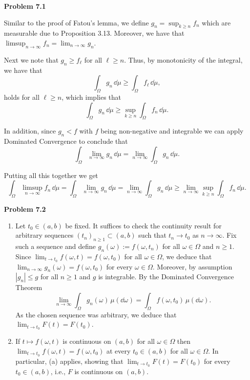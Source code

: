 \documentclass{lecturenotes}
\begin{document}
\textbf{Problem 7.1}

Similar to the proof of Fatou's lemma, we define $g_n = \sup_{k \ge n} f_n$ which are measurable due to Proposition 3.13. Moreover, we have that $\limsup_{n \to \infty} f_n = \lim_{n \to \infty} g_n$.

Next we note that $g_n \ge f_\ell$ for all $\ell \ge n$. Thus, by monotonicity of the integral, we have that
\[
	\int_\Omega g_n \, \dd \mu \ge \int_\Omega f_\ell \, \dd \mu,
\]
holds for all $\ell \ge n$, which implies that
\[
	\int_\Omega g_n \, \dd \mu \ge \sup_{k \ge n} \int_\Omega f_n \, \dd \mu.
\]

In addition, since $g_n < f$ with $f$ being non-negative and integrable we can apply Dominated Convergence to conclude that
\[
	\int_\Omega \lim_{n \to \infty} g_n \, \dd \mu = \lim_{n \to \infty} \int_\Omega g_n \, \dd \mu.
\]

Putting all this together we get
\[
	\int_\Omega \limsup_{n \to \infty} f_n \, \dd \mu
	= \int_\Omega \lim_{n \to \infty} g_n \, \dd \mu = \lim_{n \to \infty} \int_\Omega g_n \, \dd \mu \ge \lim_{n \to \infty} \sup_{k \ge n} \int_\Omega f_n \, \dd \mu.
\]

\bigskip

\textbf{Problem 7.2}

\begin{enumerate}[label={(\alph*)}]
	\item Let $t_0\in (a,b)$ be fixed. It suffices to check the continuity result for arbitrary sequences $(t_n)_{n\ge 1} \subset (a, b)$ such that $t_n\to t_0$ as $n\to\infty$. Fix such a sequence and define $g_n(\omega):= f(\omega,t_n)$ for all $\omega\in\Omega$ and $n\ge 1$. Since $\lim_{t\to t_0}f(\omega,t)=f(\omega,t_0)$ for all $\omega\in\Omega$, we deduce that $\lim_{n\to\infty} g_n(\omega) = f(\omega,t_0)$ for every $\omega\in\Omega$. Moreover, by assumption $|g_n| \le g$ for all $n \ge 1$ and $g$ is integrable. By the Dominated Convergence Theorem
\[
	\lim_{n\to\infty} \int_\Omega g_n(\omega)\,\mu(\dd\omega) = \int_\Omega f(\omega,t_0)\,\mu(\dd\omega).
\]
As the chosen sequence was arbitrary, we deduce that $\lim_{t\to t_0} F(t) = F(t_0)$.

	\item If $t\mapsto f(\omega,t)$ is continuous on $(a, b)$ for all $\omega\in\Omega$ then $\lim_{t\to t_0}f(\omega,t)=f(\omega,t_0)$ at every $t_0\in(a,b)$ for all $\omega\in\Omega$. In particular, (a) applies, showing that $\lim_{t\to t_0} F(t) = F(t_0)$ for every $t_0\in (a,b)$, i.e., $F$ is continuous on $(a, b)$.
\end{enumerate}
\end{document}

